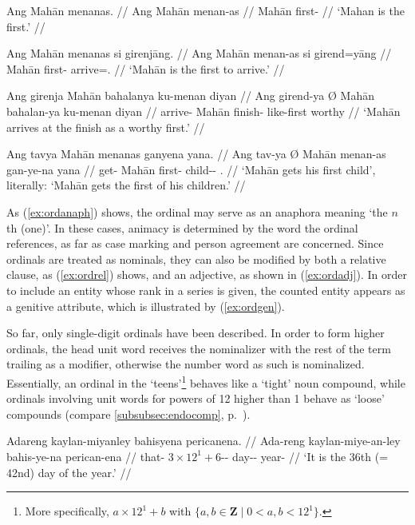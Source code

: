\pex\label{ex:ord}
\a\label{ex:ordanaph}\begingl
	\gla Ang Mahān menanas. //
	\glb Ang Mahān menan-as //
	\glc \Aarg{} Mahān first-\Parg{} //
	\glft `Mahan is the first.' //
\endgl

\a\label{ex:ordrel}\begingl
	\gla Ang Mahān menanas si girenjāng. //
	\glb Ang Mahān menan-as si girend=yāng //
	\glc \Aarg{} Mahān first-\Parg{} \Rel{} arrive=\TsgM{}.\Aarg{} //
	\glft `Mahān is the first to arrive.' //
\endgl

\a\label{ex:ordadj}\begingl
	\gla Ang girenja {} Mahān bahalanya ku-menan diyan //
	\glb Ang girend-ya Ø Mahān bahalan-ya ku-menan diyan //
	\glc \Aarg{} arrive-\TsgM{} \Top{} Mahān finish-\Loc{} like-first 
		worthy //
	\glft `Mahān arrives at the finish as a worthy first.' //
\endgl

\a\label{ex:ordgen}\begingl
	\gla Ang tavya {} Mahān menanas ganyena yana. //
	\glb Ang tav-ya Ø Mahān menan-as gan-ye-na yana //
	\glc \AgtT{} get-\TsgM{} \Top{} Mahān first-\Parg{} child-\Pl{}-\Gen{} 
		\TsgM{}.\Gen{} //
	\glft `Mahān gets his first child', \\
		literally: `Mahān gets the first of his children.' //
\endgl

\xe

As (\ref{ex:ordanaph}) shows, the ordinal may serve as an anaphora meaning `the
$n$th (one)'. In these cases, animacy is determined by the word the ordinal
references, as far as case marking and person agreement are concerned. Since
ordinals are treated as nominals, they can also be modified by both a relative
clause, as (\ref{ex:ordrel}) shows, and an adjective, as shown in
(\ref{ex:ordadj}). In order to include an entity whose rank in a series is
given, the counted entity appears as a genitive attribute, which is illustrated
by (\ref{ex:ordgen}).

So far, only single-digit ordinals have been described. In order to form higher
ordinals, the head unit word receives the nominalizer with the rest of the term
trailing as a modifier, otherwise the number word as such is nominalized.
Essentially, an ordinal in the `teens'\footnote{More specifically, $a \times
12^1 + b$ with $\{a,b \in \textbf{Z} \mid 0 < a,b < 12^1\}$.} behaves like a
`tight' noun compound, while ordinals involving unit words for powers of 12
higher than 1 behave as `loose' compounds (compare
\autoref{subsubsec:endocomp}, p.~\pageref{loosecomp}). 

\pex
\a\label{ex:ordtightcomp}\begingl
	\gla Adareng kaylan-miyanley bahisyena pericanena. //
	\glb Ada-reng kaylan-miye-an-ley bahis-ye-na perican-ena //
	\glc that-\AargI{} {$3 \times 12^1 + 6$-\Nmlz{}-\PargI{}} 
		day-\Pl{}-\Gen{} year-\Gen{} //
	\glft `It is the 36th (=\,42nd) day of the year.' //
\endgl

